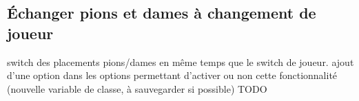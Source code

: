 
\subsection{Échanger pions et dames à changement de joueur}

switch des placements pions/dames en même temps que le switch de joueur.
ajout d'une option dans les options permettant d'activer ou non cette fonctionnalité (nouvelle variable de classe, à sauvegarder si possible)
TODO

